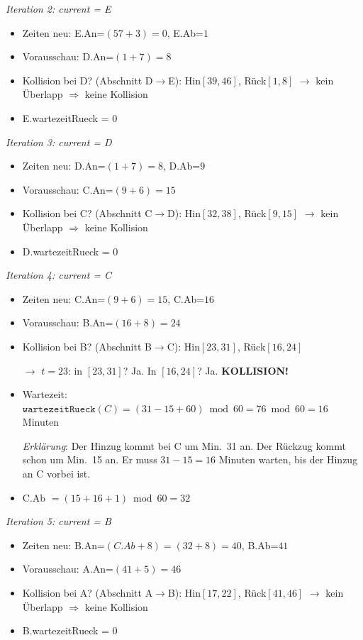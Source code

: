 \documentclass[12pt,a4paper]{article}
\begin{document}
\begin{beispielbox}[title={Einseitiges Warten -- Beispiel2: A--B--C--D--E--F--G, Abstände: 5 8 6 7 3 2, Start: 17}]
\textit{Iteration 2: current = E}

\begin{itemize}
    \item Zeiten neu: E.An=$(57+3)=0$, E.Ab=$1$
    \item Vorausschau: D.An=$(1+7)=8$
    \item Kollision bei D? (Abschnitt D$\to$E): Hin$[39,46]$, Rück$[1,8]$ $\to$ kein Überlapp $\Rightarrow$ keine Kollision
    \item E.wartezeitRueck = 0
\end{itemize}

\textit{Iteration 3: current = D}

\begin{itemize}
    \item Zeiten neu: D.An=$(1+7)=8$, D.Ab=$9$
    \item Vorausschau: C.An=$(9+6)=15$
    \item Kollision bei C? (Abschnitt C$\to$D): Hin$[32,38]$, Rück$[9,15]$ $\to$ kein Überlapp $\Rightarrow$ keine Kollision
    \item D.wartezeitRueck = 0
\end{itemize}

\textit{Iteration 4: current = C}

\begin{itemize}
    \item Zeiten neu: C.An=$(9+6)=15$, C.Ab=$16$
    \item Vorausschau: B.An=$(16+8)=24$
    \item Kollision bei B? (Abschnitt B$\to$C): Hin$[23,31]$, Rück$[16,24]$

    $\to$ $t=23$: in $[23,31]$? Ja. In $[16,24]$? Ja. \textbf{KOLLISION!}
    \item Wartezeit: $\texttt{wartezeitRueck}(C) = (31 - 15 + 60)\bmod60 = 76\bmod60 = 16$ Minuten

    \textit{Erklärung}: Der Hinzug kommt bei C um Min.~31 an. Der Rückzug kommt schon um Min.~15 an. Er muss $31-15=16$ Minuten warten, bis der Hinzug an C vorbei ist.
    \item C.Ab $= (15 + 16 + 1)\bmod60 = 32$
\end{itemize}

\textit{Iteration 5: current = B}

\begin{itemize}
    \item Zeiten neu: B.An=$(C.Ab+8)=(32+8)=40$, B.Ab=$41$
    \item Vorausschau: A.An=$(41+5)=46$
    \item Kollision bei A? (Abschnitt A$\to$B): Hin$[17,22]$, Rück$[41,46]$ $\to$ kein Überlapp $\Rightarrow$ keine Kollision
    \item B.wartezeitRueck = 0
\end{itemize}


\end{beispielbox}
\end{document}
